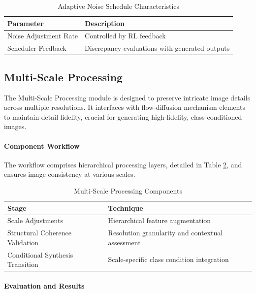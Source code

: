 \begin{table}[!ht]
\centering
\label{tab:ral-noise-schedule}
\begin{tabular}{|l|l|}
\hline
\textbf{Parameter} & \textbf{Description} \\ \hline
Noise Adjustment Rate & Controlled by RL feedback \\ \hline
Scheduler Feedback & Discrepancy evaluations with generated outputs \\ \hline
\end{tabular}
\caption{Adaptive Noise Schedule Characteristics}
\end{table}

\subsection{Multi-Scale Processing}

The Multi-Scale Processing module is designed to preserve intricate image details across multiple resolutions. It interfaces with flow-diffusion mechanism elements to maintain detail fidelity, crucial for generating high-fidelity, class-conditioned images.

\paragraph{Component Workflow}
The workflow comprises hierarchical processing layers, detailed in Table \ref{tab:multi-scale-components}, and ensures image consistency at various scales.

\begin{table}[!ht]
\centering
\label{tab:multi-scale-components}
\begin{tabular}{|l|l|}
\hline
\textbf{Stage} & \textbf{Technique} \\ \hline
Scale Adjustments & Hierarchical feature augmentation \\ \hline
Structural Coherence Validation & Resolution granularity and contextual assessment \\ \hline
Conditional Synthesis Transition & Scale-specific class condition integration \\ \hline
\end{tabular}
\caption{Multi-Scale Processing Components}
\end{table}

\paragraph{Evaluation and Results}

